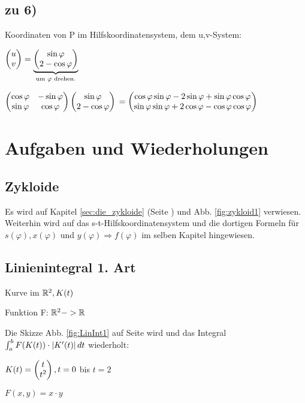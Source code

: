 \subsection{zu 6)}
\renewcommand{\ldate}{2016-01-16}
Koordinaten von P im Hilfskoordinatensystem, dem u,v-System: 

$  \begin{pmatrix} u\\v \end{pmatrix}  = \underbrace{ \begin{pmatrix} \sin \varphi\\2 - \cos \varphi \end{pmatrix} }_{\textrm{um } \varphi \textrm{ drehen.}} $

$  \begin{pmatrix} \cos \varphi & -\sin \varphi\\\sin \varphi & \cos \varphi \end{pmatrix}   \begin{pmatrix} \sin \varphi\\2-\cos \varphi \end{pmatrix}  $
$= \begin{pmatrix} \cos \varphi \sin \varphi - 2 \sin \varphi + \sin \varphi \cos \varphi\\\sin \varphi \sin \varphi + 2 \cos \varphi - \cos \varphi \cos \varphi  \end{pmatrix}  $

\section{Aufgaben und Wiederholungen}

\subsection{Zykloide}
Es wird auf Kapitel \ref{sec:die_zykloide} (Seite \pageref{sec:die_zykloide}) und Abb. \ref{fig:zykloid1} verwiesen. Weiterhin wird auf das s-t-Hilfskoordinatensystem und die dortigen Formeln für $ s(\varphi), x(\varphi) $ und $ y(\varphi) \Rightarrow f(\varphi) $ im selben Kapitel hingewiesen. 

\subsection{Linienintegral 1. Art}
Kurve im $\mathbb{R}^2, K(t)$

Funktion F: $\mathbb{R}^2 -> \mathbb{R}$

Die Skizze Abb. \ref{fig:LinInt1} auf Seite \pageref{fig:LinInt1} wird und das Integral $\int_{a}^{b} F(K(t)) \cdot  \left\vert K'(t) \right\vert  dt$ wiederholt:

$ K(t) =  \begin{pmatrix} t\\t^2 \end{pmatrix} , t=0$ bis $t = 2 $

$ F(x,y) = x\cdot y $

